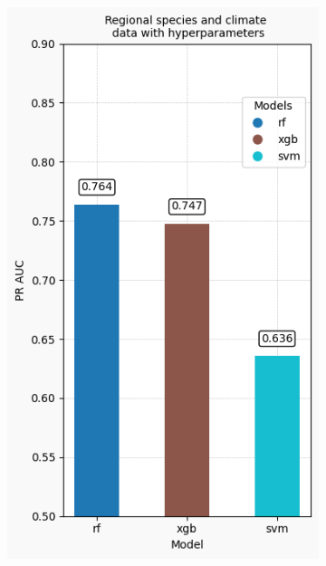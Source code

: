 \documentclass{article}
\begin{document}
\begin{figure}[H]
    \begin{subfigure}[b]{0.15\linewidth}
        \centering
        \includegraphics[width=\linewidth]{Regional species and climate data with hyperparameters.png}
        \caption{}
        \label{fig:regional_species_climate}
    \end{subfigure}
    \hspace{0.1cm}
    \begin{subfigure}[b]{0.15\linewidth}
        \centering

\end{subfigure}
\end{figure}
\end{document}
